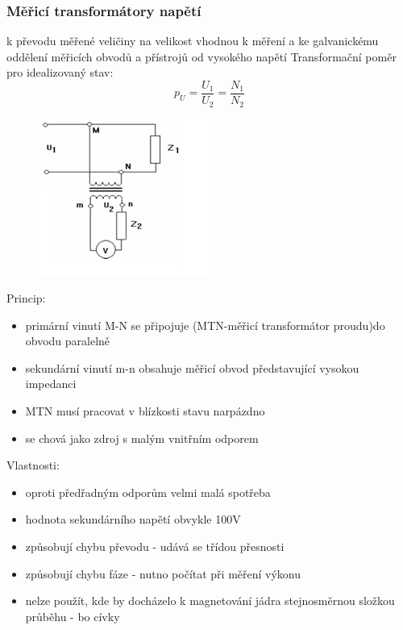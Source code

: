 \subsubsection*{Měřicí transformátory napětí}
k převodu měřené veličiny na velikost vhodnou k měření a ke galvanickému oddělení měřicích obvodů a přístrojů od vysokého napětí
Transformační poměr pro idealizovaný stav:
\begin{equation}
    p_U = \frac{U_1}{U_2} = \frac{N_1}{N_2}
\end{equation}
\begin{figure}[H]
    \centering
    \includegraphics*[scale = 2]{images/napeti_transformator.png}
\end{figure}
Princip:
\begin{itemize}
    \item primární vinutí M-N se připojuje (MTN-měřicí transformátor proudu)do obvodu paralelně
    \item sekundární vinutí m-n obsahuje měřicí obvod představující vysokou impedanci
    \item MTN musí pracovat v blízkosti stavu narpázdno
    \item se chová jako zdroj s malým vnitřním odporem
\end{itemize}
Vlastnosti:
\begin{itemize}
    \item oproti předřadným odporům velmi malá spotřeba
    \item hodnota sekundárního napětí obvykle 100V
    \item způsobují chybu převodu - udává se třídou přesnosti
    \item způsobují chybu fáze - nutno počítat při měření výkonu
    \item nelze použít, kde by docházelo k magnetování jádra stejnosměrnou složkou průběhu - bo cívky
\end{itemize}
